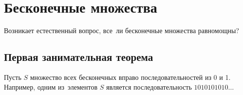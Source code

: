 \documentclass[12pt,a4paper]{article}
\begin{document}
 

\section{Бесконечные множества} 

Возникает естественный вопрос, все~ли бесконечные множества равномощны?

\subsection{Первая занимательная теорема}

Пусть $S$ множество всех бесконечных вправо последовательностей из 0 и 1. Например, одним из~элементов $S$ является последовательность $1010101010\ldots$


\end{document}
